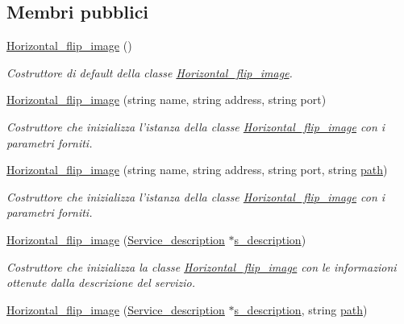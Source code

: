 \subsection*{Membri pubblici}
\begin{DoxyCompactItemize}
\item 
\hyperlink{class_horizontal__flip__image_a948547064eeea73d824b899a99d98803}{Horizontal\-\_\-flip\-\_\-image} ()
\begin{DoxyCompactList}\small\item\em Costruttore di default della classe \hyperlink{class_horizontal__flip__image}{Horizontal\-\_\-flip\-\_\-image}. \end{DoxyCompactList}\item 
\hyperlink{class_horizontal__flip__image_a168239ec414f64df44d857dc58179851}{Horizontal\-\_\-flip\-\_\-image} (string name, string address, string port)
\begin{DoxyCompactList}\small\item\em Costruttore che inizializza l'istanza della classe \hyperlink{class_horizontal__flip__image}{Horizontal\-\_\-flip\-\_\-image} con i parametri forniti. \end{DoxyCompactList}\item 
\hyperlink{class_horizontal__flip__image_a17276cff85b5be92f368e39d7289be4b}{Horizontal\-\_\-flip\-\_\-image} (string name, string address, string port, string \hyperlink{class_horizontal__flip__image_a56deaa91c8efad258a778d4fece9c81b}{path})
\begin{DoxyCompactList}\small\item\em Costruttore che inizializza l'istanza della classe \hyperlink{class_horizontal__flip__image}{Horizontal\-\_\-flip\-\_\-image} con i parametri forniti. \end{DoxyCompactList}\item 
\hyperlink{class_horizontal__flip__image_a659aa882c8eb312880807c6cda07bf06}{Horizontal\-\_\-flip\-\_\-image} (\hyperlink{struct_service__description}{Service\-\_\-description} $\ast$\hyperlink{class_service_a55e991ff18c0dceca202388a771283dc}{s\-\_\-description})
\begin{DoxyCompactList}\small\item\em Costruttore che inizializza la classe \hyperlink{class_horizontal__flip__image}{Horizontal\-\_\-flip\-\_\-image} con le informazioni ottenute dalla descrizione del servizio. \end{DoxyCompactList}\item 
\hyperlink{class_horizontal__flip__image_a3421937ee79069dd965b01e21c0191b4}{Horizontal\-\_\-flip\-\_\-image} (\hyperlink{struct_service__description}{Service\-\_\-description} $\ast$\hyperlink{class_service_a55e991ff18c0dceca202388a771283dc}{s\-\_\-description}, string \hyperlink{class_horizontal__flip__image_a56deaa91c8efad258a778d4fece9c81b}{path})

\end{DoxyCompactItemize}
